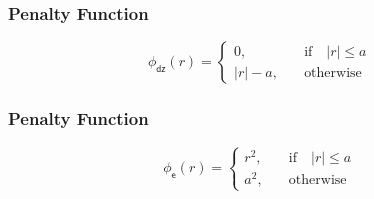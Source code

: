 \begin{frame}
  \frametitle{Penalty Function \cont}

  
  \begin{displaymath}
    \phi_\mathsf{dz}(r) = 
      \left\{
        \begin{array}{cl}
          0,     & \quad \mbox{if} \quad |r| \leq a\\
          |r|-a, & \quad \mbox{otherwise}
        \end{array}
      \right.
  \end{displaymath}

  \begin{figure}
  \end{figure}
\end{frame}


\begin{frame}
  \frametitle{Penalty Function \cont}

  
  \begin{displaymath}
    \phi_\mathsf{e}(r) = 
      \left\{
        \begin{array}{cl}
          r^2, & \quad \mbox{if} \quad |r| \leq a \\
          a^2, & \quad \mbox{otherwise}
        \end{array}
      \right.
  \end{displaymath}

  \begin{figure}
  \end{figure}
\end{frame}


